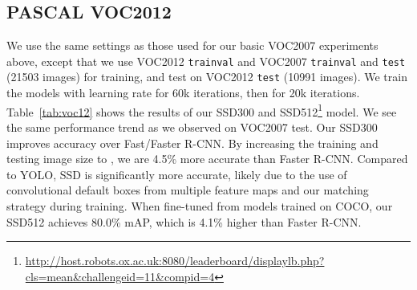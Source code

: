 \documentclass[runningheads]{llncs}
\begin{document}
\subsection{PASCAL VOC2012}
We use the same settings as those used for our basic VOC2007 experiments above, except that we use VOC2012 \texttt{trainval} and VOC2007 \texttt{trainval} and \texttt{test} (21503 images) for training, and test on VOC2012 \texttt{test} (10991 images). We train the models with  learning rate for 60k iterations, then  for 20k iterations. Table~\ref{tab:voc12} shows the results of our SSD300 and SSD512\footnote{\ssmall\url{http://host.robots.ox.ac.uk:8080/leaderboard/displaylb.php?cls=mean&challengeid=11&compid=4}} model. We see the same performance trend as we observed on VOC2007 test. Our SSD300 improves accuracy over Fast/Faster R-CNN. By increasing the training and testing image size to , we are 4.5\% more accurate than Faster R-CNN. Compared to YOLO, SSD is significantly more accurate, likely due to  the use of convolutional default boxes from multiple feature maps and our matching strategy during training. When fine-tuned from models trained on COCO, our SSD512 achieves 80.0\% mAP, which is 4.1\% higher than Faster R-CNN.
\end{document}
